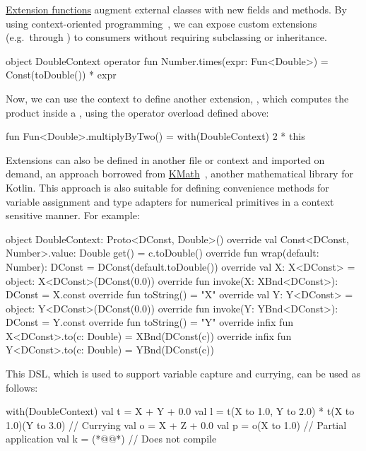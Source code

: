 \href{https://kotlinlang.org/docs/reference/extensions.html}{Extension functions} augment external classes with new fields and methods. By using context-oriented programming~\citep{hirschfeld2008context}, we can expose custom extensions (e.g.\ through ) to consumers without requiring subclassing or inheritance.
%
\begin{kotlinlisting}[caption={We can provide numerical extensions, wrapped in a context.}]
object DoubleContext {
    operator fun Number.times(expr: Fun<Double>) = Const(toDouble()) * expr
}
\end{kotlinlisting}
%
Now, we can use the context to define another extension, , which computes the product inside a , using the operator overload defined above:
%
\begin{kotlinlisting}
fun Fun<Double>.multiplyByTwo() = with(DoubleContext) { 2 * this }
\end{kotlinlisting}
%
Extensions can also be defined in another file or context and imported on demand, an approach borrowed from \href{https://github.com/mipt-npm/kmath}{KMath}~\citep{nozik2019kmath}, another mathematical library for Kotlin. This approach is also suitable for defining convenience methods for variable assignment and type adapters for numerical primitives in a context sensitive manner. For example:
%
\begin{kotlinlisting}
object DoubleContext: Proto<DConst, Double>() {
    override val Const<DConst, Number>.value: Double
    get() = c.toDouble()
    override fun wrap(default: Number): DConst = DConst(default.toDouble())
    override val X: X<DConst> = object: X<DConst>(DConst(0.0)) {
        override fun invoke(X: XBnd<DConst>): DConst = X.const
        override fun toString() = "X"
    }
    override val Y: Y<DConst> = object: Y<DConst>(DConst(0.0)) {
        override fun invoke(Y: YBnd<DConst>): DConst = Y.const
        override fun toString() = "Y"
    }
    override infix fun X<DConst>.to(c: Double) = XBnd(DConst(c))
    override infix fun Y<DConst>.to(c: Double) = YBnd(DConst(c))
}
\end{kotlinlisting}
%
This DSL, which is used to support variable capture and currying, can be used as follows:
%
\begin{kotlinlisting}
with(DoubleContext) {
    val t = X + Y + 0.0
    val l = t(X to 1.0, Y to 2.0) * t(X to 1.0)(Y to 3.0) // Currying
    val o = X + Z + 0.0
    val p = o(X to 1.0) // Partial application
    val k = (*@@*) // Does not compile
}
\end{kotlinlisting}

